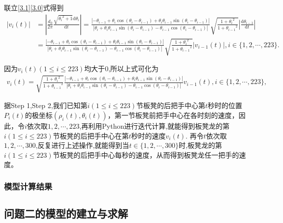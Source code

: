 \documentclass{cumcmthesis}
\begin{document}
\par 联立\eqref{3.1}\eqref{3.0}式得到
\begin{align}
|v_i(t)| &= \left|\frac{d_0}{2\pi}\frac{\sqrt{{\theta _i}^2 + 1}\mathrm{d}\theta _i}{\mathrm{d}t}\right| 
= \frac{|-\theta _{i - 1}+\theta _i\cos(\theta _{i }-\theta _{i-1})+\theta _i\theta _{i - 1}\sin(\theta _{i }-\theta _{i-1})|}{|\theta _i+\theta _i\theta _{i - 1}\sin(\theta _i -\theta _{i-1})-\theta _{i - 1}\cos(\theta _i -\theta _{i-1})|}\sqrt{\frac{1 + {\theta _i}^2}{1 + {\theta _{i - 1}}^2}}\left|\frac{\mathrm{d}\theta _{i - 1}}{\mathrm{d}t}\right| \label{1.........15}\\
&= \frac{|-\theta _{i - 1}+\theta _i\cos(\theta _{i }-\theta _{i-1})+\theta _i\theta _{i - 1}\sin(\theta _{i }-\theta _{i-1})|}{|\theta _i+\theta _i\theta _{i - 1}\sin(\theta _i -\theta _{i-1})-\theta _{i - 1}\cos(\theta _i -\theta _{i-1})|}\sqrt{\frac{1 + {\theta _i}^2}{1 + {\theta _{i - 1}}^2}}|v_{i - 1}(t)|, i\in \{1, 2, \cdots, 223\}.\label{1.........16}
\end{align}
\par 因为\(v_i(t) (1\leqslant i\leqslant 223)\)均大于\(0\),所以上式可化为
\begin{align}\label{1.........17}
v_i(t) = \sqrt{\frac{1 + {\theta _i}^2}{1 + {\theta _{i - 1}}^2}}\frac{|-\theta _{i - 1}+\theta _i\cos(\theta _{i }-\theta _{i-1})+\theta _i\theta _{i - 1}\sin(\theta _{i }-\theta _{i-1})|}{|\theta _i+\theta _i\theta _{i - 1}\sin(\theta _i -\theta _{i-1})-\theta _{i - 1}\cos(\theta _i -\theta _{i-1})|}v_{i - 1}(t), i\in \{1, 2, \cdots, 223\},
\end{align}
\par 据Step 1,Step 2,我们已知第\(i(1\leqslant i\leqslant 223)\)节板凳的后把手中心第\(t\)秒时的位置\(P_{i}(t)\)的极坐标\((\rho _{i}(t),\theta _{i}(t))\)，第一节板凳前把手中心在各时刻的速度，因此，令\(i\)依次取\(1, 2, \cdots, 223\),再利用Python进行迭代计算,就能得到板凳龙的第\(i(1\leqslant i\leqslant 223)\)节板凳的后把手中心在第\(t\)秒时的速度\(v_i(t)\).
再令\(t\)依次取\(1, 2, \cdots, 300\),反复进行上述操作,就能得到当\(t\in \{1, 2, \cdots, 300\}\)时,板凳龙的第\(i(1\leqslant i\leqslant 223)\)节板凳的后把手中心每秒的速度，从而得到板凳龙任一把手的速度。


    \subsubsection{模型计算结果}
\subsection{问题二的模型的建立与求解}
\end{document}

